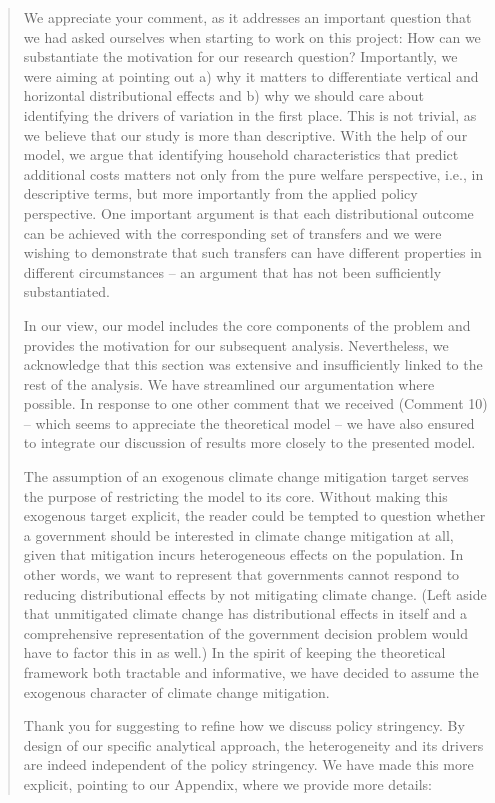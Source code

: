 \documentclass[11pt]{article}
\newenvironment{response}
{\begin{quote}\color{black}}
{\end{quote}}
\begin{document}
\begin{response}

We appreciate your comment, as it addresses an important question that we had asked ourselves when starting to work on this project: How can we substantiate the motivation for our research question? Importantly, we were aiming at pointing out a) why it matters to differentiate vertical and horizontal distributional effects and b) why we should care about identifying the drivers of variation in the first place. This is not trivial, as we believe that our study is more than descriptive. With the help of our model, we argue that identifying household characteristics that predict additional costs matters not only from the pure welfare perspective, i.e., in descriptive terms, but more importantly from the applied policy perspective. One important argument is that each distributional outcome can be achieved with the corresponding set of transfers and we were wishing to demonstrate that such transfers can have different properties in different circumstances -- an argument that has not been sufficiently substantiated. 

In our view, our model includes the core components of the problem and provides the motivation for our subsequent analysis. Nevertheless, we acknowledge that this section was extensive and insufficiently linked to the rest of the analysis. We have streamlined our argumentation where possible. In response to one other comment that we received (Comment 10) -- which seems to appreciate the theoretical model -- we have also ensured to integrate our discussion of results more closely to the presented model.

The assumption of an exogenous climate change mitigation target serves the purpose of restricting the model to its core. Without making this exogenous target explicit, the reader could be tempted to question whether a government should be interested in climate change mitigation at all, given that mitigation incurs heterogeneous effects on the population. In other words, we want to represent that governments cannot respond to reducing distributional effects by not mitigating climate change. (Left aside that unmitigated climate change has distributional effects in itself and a comprehensive representation of the government decision problem would have to factor this in as well.) In the spirit of keeping the theoretical framework both tractable and informative, we have decided to assume the exogenous character of climate change mitigation.

Thank you for suggesting to refine how we discuss policy stringency. By design of our specific analytical approach, the heterogeneity and its drivers are indeed independent of the policy stringency. We have made this more explicit, pointing to our Appendix, where we provide more details:

\end{response}
\end{document}
